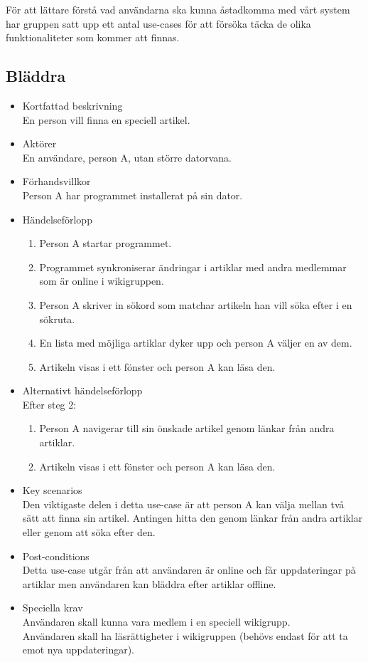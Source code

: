 För att lättare förstå vad användarna ska kunna åstadkomma med vårt system har gruppen satt upp ett antal use-cases för att försöka täcka de olika funktionaliteter som kommer att finnas.

\subsection{Bläddra}

\begin{itemize}
	\item Kortfattad beskrivning
	\\En person vill finna en speciell artikel.
	\item Aktörer
	\\En användare, person A, utan större datorvana.
	\item Förhandsvillkor
	\\Person A har programmet installerat på sin dator.
	\item Händelseförlopp
	\begin{enumerate}
		\item Person A startar programmet.
		\item Programmet synkroniserar ändringar i artiklar med andra medlemmar som är online i wikigruppen.
		\item Person A skriver in sökord som matchar artikeln han vill söka efter i en sökruta.
		\item En lista med möjliga artiklar dyker upp och person A väljer en av dem.
		\item Artikeln visas i ett fönster och person A kan läsa den.
	\end{enumerate}
	\item Alternativt händelseförlopp
	\\Efter steg 2:
	\begin{enumerate}
		\item Person A navigerar till sin önskade artikel genom länkar från andra artiklar.	
		\item Artikeln visas i ett fönster och person A kan läsa den.
	\end{enumerate}	
	\item Key scenarios
	\\Den viktigaste delen i detta use-case är att person A kan välja mellan två sätt att finna sin artikel. Antingen hitta den genom länkar från andra artiklar eller genom att söka efter den.
	\item Post-conditions
	\\Detta use-case utgår från att användaren är online och får uppdateringar på artiklar men användaren kan bläddra efter artiklar offline.
	\item Speciella krav
	\\ Användaren skall kunna vara medlem i en speciell wikigrupp.
	\\ Användaren skall ha läsrättigheter i wikigruppen (behövs endast för att ta emot nya uppdateringar).
\end{itemize}

